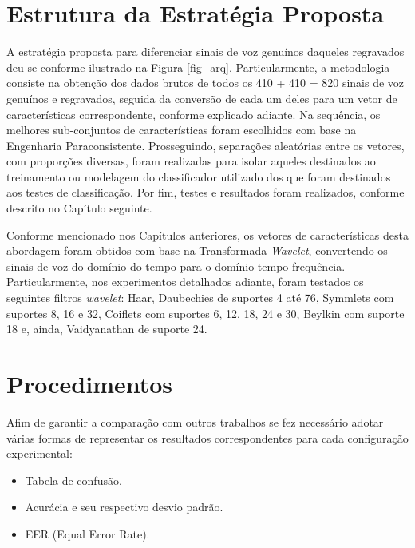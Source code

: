 	\section{Estrutura da Estratégia Proposta}
		\par A estratégia proposta para diferenciar sinais de voz genuínos daqueles regravados deu-se conforme ilustrado na Figura \ref{fig_arq}. Particularmente, a metodologia consiste na obtenção dos dados brutos de todos os 410 + 410 = 820 sinais de voz genuínos e regravados, seguida da conversão de cada um deles para um vetor de características correspondente, conforme explicado adiante. Na sequência, os melhores sub-conjuntos de características foram escolhidos com base na Engenharia Paraconsistente. Prosseguindo, separações aleatórias entre os vetores, com proporções diversas, foram realizadas para isolar aqueles destinados ao treinamento ou modelagem do classificador utilizado dos que foram destinados aos testes de classificação. Por fim, testes e resultados foram realizados, conforme descrito no Capítulo seguinte.
		
		
		
		\par Conforme mencionado nos Capítulos anteriores, os vetores de características desta abordagem foram obtidos com base na Transformada \textit{Wavelet}, convertendo os sinais de voz do domínio do tempo para o domínio tempo-frequência. Particularmente, nos experimentos detalhados adiante, foram testados os seguintes filtros \textit{wavelet}: Haar, Daubechies de suportes 4 até 76, Symmlets com suportes 8, 16 e 32, Coiflets com suportes 6, 12, 18, 24 e 30, Beylkin com suporte 18 e, ainda, Vaidyanathan de suporte 24.

	\section{Procedimentos}
		\par Afim de garantir a comparação com outros trabalhos se fez necessário adotar várias formas de representar os resultados correspondentes para cada configuração experimental:
		\begin{itemize}
			\item Tabela de confusão.
			\item Acurácia e seu respectivo desvio padrão.
			\item EER (Equal Error Rate).
		\end{itemize}
		
